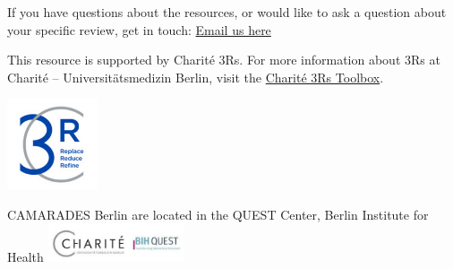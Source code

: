 \documentclass[
]{book}
\begin{document}
If you have questions about the resources, or would like to ask a question about your specific review, get in touch: \href{mailto:CAMARADES.berlin@charite.de}{Email us here}

This resource is supported by Charité 3Rs. For more information about 3Rs at Charité -- Universitätsmedizin Berlin, visit the \href{https://charite3r.charite.de/en/charite_3r_toolbox/}{Charité 3Rs Toolbox}.

\includegraphics[width=0.2\textwidth,height=\textheight]{figs/charite3rs_logo.jpg}

CAMARADES Berlin are located in the QUEST Center, Berlin Institute for Health
\includegraphics[width=0.3\textwidth,height=\textheight]{charite-BIHquest.jpg}

  
\end{document}
